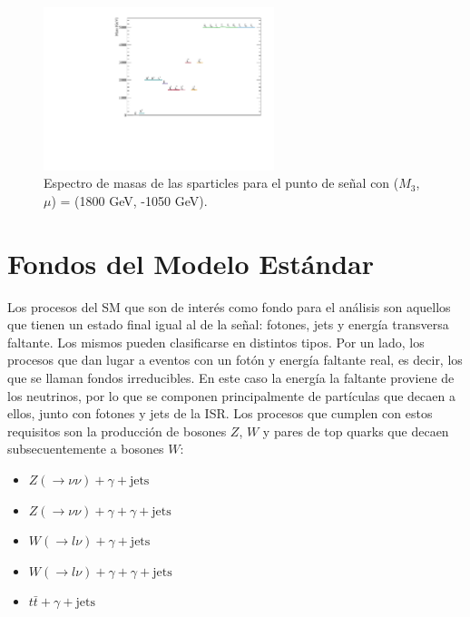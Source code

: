 \begin{figure}
  \centering
  \includegraphics[width=0.6\textwidth]{images/analysis/phb_mass_spectrum.pdf}
  \caption{Espectro de masas de las sparticles para el punto de señal con ($M_3$, $\mu$) = (1800 GeV, -1050 GeV). }
  \label{fig:mass_spec}
\end{figure}



\section{Fondos del Modelo Estándar}\label{sec:sm_backgrounds}


Los procesos del SM que son de interés como fondo para el análisis son aquellos que tienen un estado final igual al de la señal: fotones, jets y energía transversa faltante. Los mismos pueden clasificarse en distintos tipos. Por un lado, los procesos que dan lugar a eventos con un fotón y energía faltante real, es decir, los que se llaman fondos irreducibles. En este caso la energía la faltante proviene de los neutrinos, por lo que se componen principalmente de partículas que decaen a ellos, junto con fotones y jets de la ISR. Los procesos que cumplen con estos requisitos son la producción de bosones $Z$, $W$ y pares de top quarks que decaen subsecuentemente a bosones $W$:

\begin{itemize}
  \item $Z(\rightarrow \nu\nu) + \gamma + \text{jets}$
  \item $Z(\rightarrow \nu\nu) + \gamma + \gamma + \text{jets}$
  \item $W(\rightarrow l\nu) + \gamma + \text{jets}$
  \item $W(\rightarrow l\nu) + \gamma + \gamma + \text{jets}$
  \item $t\bar{t} + \gamma + \text{jets}$
\end{itemize}


